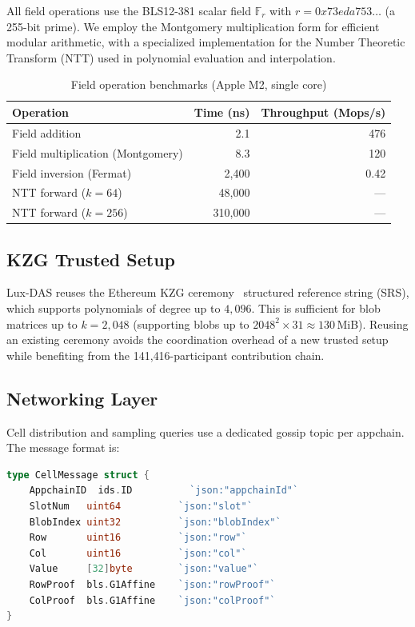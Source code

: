 \documentclass[11pt,a4paper]{article}
\theoremstyle{plain}
\theoremstyle{definition}
\theoremstyle{remark}
\begin{document}
All field operations use the BLS12-381 scalar field
$\mathbb{F}_r$ with $r = 0x73eda753\ldots$ (a 255-bit prime). We employ the Montgomery
multiplication form for efficient modular arithmetic, with a specialized implementation for
the Number Theoretic Transform (NTT) used in polynomial evaluation and interpolation.

\begin{table}[H]
\centering
\caption{Field operation benchmarks (Apple M2, single core)}
\label{tab:field-ops}
\begin{tabular}{lrr}
\toprule
\textbf{Operation} & \textbf{Time (ns)} & \textbf{Throughput (Mops/s)} \\
\midrule
Field addition & 2.1 & 476 \\
Field multiplication (Montgomery) & 8.3 & 120 \\
Field inversion (Fermat) & 2{,}400 & 0.42 \\
NTT forward ($k=64$) & 48{,}000 & --- \\
NTT forward ($k=256$) & 310{,}000 & --- \\
\bottomrule
\end{tabular}
\end{table}

\subsection{KZG Trusted Setup}

Lux-DAS reuses the Ethereum KZG ceremony~\cite{ethereumceremony} structured reference string
(SRS), which supports polynomials of degree up to $4{,}096$. This is sufficient for blob
matrices up to $k = 2{,}048$ (supporting blobs up to $2048^2 \times 31 \approx 130$\,MiB).
Reusing an existing ceremony avoids the coordination overhead of a new trusted setup while
benefiting from the 141{,}416-participant contribution chain.

\subsection{Networking Layer}

Cell distribution and sampling queries use a dedicated gossip topic per appchain. The message
format is:

\begin{lstlisting}[language=Go, caption={Cell gossip message}]
type CellMessage struct {
    AppchainID  ids.ID          `json:"appchainId"`
    SlotNum   uint64          `json:"slot"`
    BlobIndex uint32          `json:"blobIndex"`
    Row       uint16          `json:"row"`
    Col       uint16          `json:"col"`
    Value     [32]byte        `json:"value"`
    RowProof  bls.G1Affine    `json:"rowProof"`
    ColProof  bls.G1Affine    `json:"colProof"`
}
\end{lstlisting}
\end{document}
